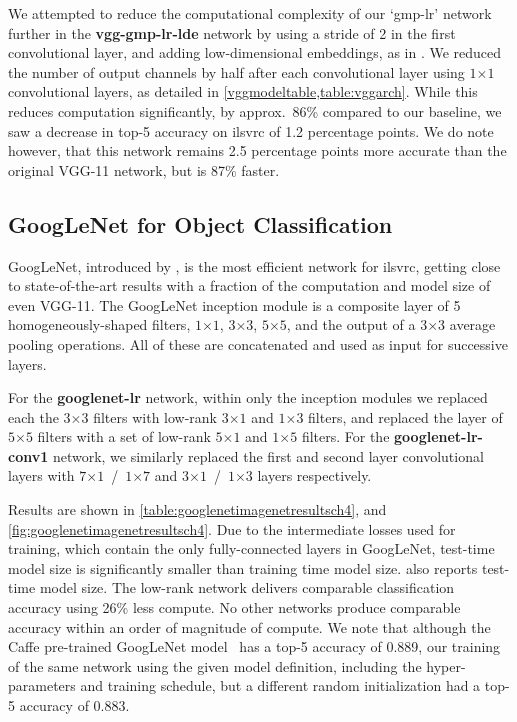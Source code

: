 \documentclass[thesis]{subfiles}
\begin{document}
    We attempted to reduce the computational complexity of our `gmp-lr' network further in the \textbf{vgg-gmp-lr-lde} network by using a stride of 2 in the first convolutional layer, and adding low-dimensional embeddings, as in \citet{Lin2013NiN,Szegedy2014going}. We reduced the number of output channels by half after each convolutional layer using $1$$\times$$1$ convolutional layers, as detailed in \cref{vggmodeltable,table:vggarch}. While this reduces computation significantly, by approx.~86\% compared to our baseline, we saw a decrease in top-5 accuracy on \gls{ilsvrc} of 1.2 percentage points. We do note however, that this network remains 2.5 percentage points more accurate than the original VGG-11 network, but is 87\% faster.
    
    \subsection{GoogLeNet for  Object Classification}
    GoogLeNet, introduced by \citet{Szegedy2014going}, is the most efficient network for \gls{ilsvrc}, getting close to state-of-the-art results with a fraction of the computation and model size of even VGG-11. The GoogLeNet \gls{inception} module is a composite layer of 5 homogeneously-shaped filters, $1$$\times$$1$, $3$$\times$$3$, $5$$\times$$5$, and the output of a 3$\times$3 average pooling operations. All of these are concatenated and used as input for successive layers. 
    
    For the \textbf{googlenet-lr} network, within only the \gls{inception} modules we replaced each the $3$$\times$$3$ filters with low-rank $3$$\times$$1$ and $1$$\times$$3$ filters, and replaced the layer of $5$$\times$$5$ filters with a set of low-rank $5$$\times$$1$ and $1$$\times$$5$ filters. For the \textbf{googlenet-lr-conv1} network, we similarly replaced the first and second layer convolutional layers with $7$$\times$$1$~/~$1$$\times$$7$ and $3$$\times$$1$~/~$1$$\times$$3$ layers respectively.
    
    Results are shown in \cref{table:googlenetimagenetresultsch4}, and \cref{fig:googlenetimagenetresultsch4}. Due to the intermediate losses used for training, which contain the only fully-connected layers in GoogLeNet, test-time model size is significantly smaller than training time model size.  also reports test-time model size. The low-rank network delivers comparable classification accuracy using 26\% less compute.  No other networks produce comparable accuracy within an order of magnitude of compute. We note that although the Caffe pre-trained GoogLeNet model~\citep{Jia2014} has a top-5 accuracy of 0.889, our training of the same network using the given model definition, including the hyper-parameters and training schedule, but a different random initialization had a top-5 accuracy of 0.883.
    
\end{document}
